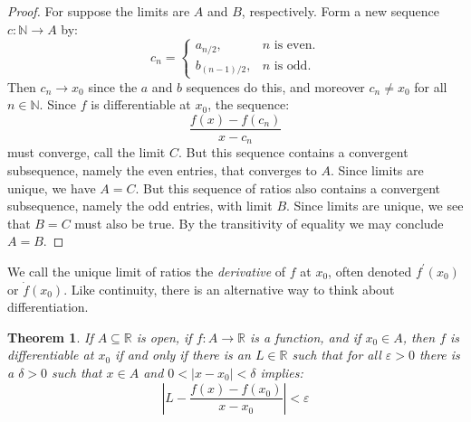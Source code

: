 \documentclass{article}
\theoremstyle{normal}
\newtheorem{theorem}{Theorem}
\begin{document}
        \begin{proof}
            For suppose the limits are $A$ and $B$, respectively.
            Form a new sequence $c:\mathbb{N}\rightarrow{A}$ by:
            \begin{equation}
                c_{n}=
                \begin{cases}
                    a_{n/2},&n\textrm{ is even.}\\
                    b_{(n-1)/2},&n\textrm{ is odd.}
                \end{cases}
            \end{equation}
            Then $c_{n}\rightarrow{x}_{0}$ since the $a$ and $b$ sequences
            do this, and moreover $c_{n}\ne{x}_{0}$ for all $n\in\mathbb{N}$.
            Since $f$ is differentiable at $x_{0}$, the sequence:
            \begin{equation}
                \frac{f(x)-f(c_{n})}{x-c_{n}}
            \end{equation}
            must converge, call the limit $C$. But this sequence contains a
            convergent subsequence, namely the even entries, that converges to
            $A$. Since limits are unique, we have $A=C$.
            But this sequence of ratios also contains a convergent subsequence,
            namely the odd entries, with limit $B$. Since limits are unique,
            we see that $B=C$ must also be true. By the transitivity of
            equality we may conclude $A=B$.
        \end{proof}
        We call the unique limit of ratios the \textit{derivative} of
        $f$ at $x_{0}$, often denoted $f^{\prime}(x_{0})$ or
        $\dot{f}(x_{0})$. Like continuity, there is an alternative way to
        think about differentiation.
        \begin{theorem}
            If $A\subseteq\mathbb{R}$ is open, if $f:A\rightarrow\mathbb{R}$ is
            a function, and if $x_{0}\in{A}$, then $f$ is differentiable at
            $x_{0}$ if and only if there is an $L\in\mathbb{R}$ such that
            for all $\varepsilon>0$ there is a $\delta>0$ such that $x\in{A}$
            and $0<|x-x_{0}|<\delta$ implies:
            \begin{equation}
                \left|
                    L-\frac{f(x)-f(x_{0})}{x-x_{0}}
                \right|<\varepsilon
            \end{equation}
        \end{theorem}
\end{document}

